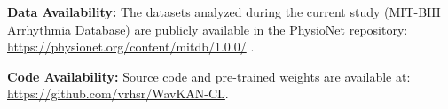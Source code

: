 \documentclass[pdflatex,sn-mathphys-num]{sn-jnl}
\theoremstyle{thmstyleone}
\theoremstyle{thmstyletwo}
\theoremstyle{thmstylethree}
\begin{document}
\textbf{Data Availability:} The datasets analyzed during the current study (MIT-BIH Arrhythmia Database) are publicly available in the PhysioNet repository: \url{https://physionet.org/content/mitdb/1.0.0/} \cite{moody_mit-bih_1992}.

\textbf{Code Availability:} Source code and pre-trained weights are available at: \url{https://github.com/vrhsr/WavKAN-CL}.


\end{document}

